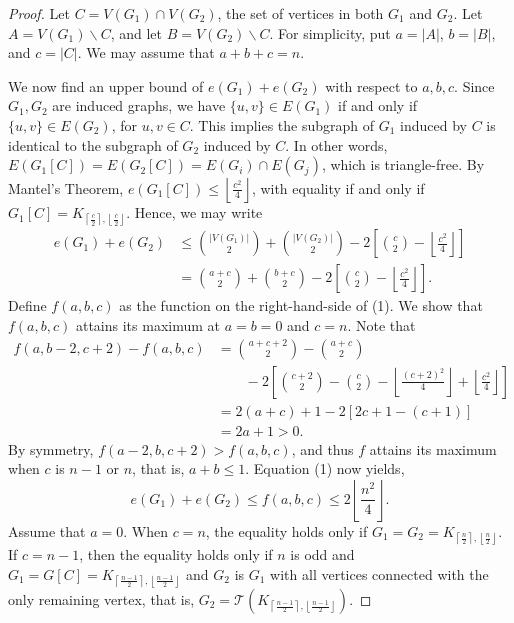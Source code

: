 \documentclass[a4paper]{article}
\begin{document}
\begin{proof}
  Let $C = V(G_1) \cap V(G_2)$, the set of vertices in both $G_1$ and $G_2$. Let $A = V(G_1)
  \backslash C$, and let $B = V(G_2) \backslash C$. For simplicity, put $a = |A|$, $b = |B|$, and $c
  = |C|$. We may assume that $a + b + c = n$.

  We now find an upper bound of $e(G_1) + e(G_2)$ with respect to $a, b, c$. Since $G_1, G_2$ are
  induced graphs, we have $\{u, v\} \in E(G_1)$ if and only if $\{u, v\} \in E(G_2)$, for $u, v \in
  C$. This implies the subgraph of $G_1$ induced by $C$ is identical to the subgraph of $G_2$
  induced by $C$. In other words, $E(G_1[C]) = E(G_2[C]) = E(G_i) \cap E(G_j)$, which is
  triangle-free. By Mantel's Theorem, $e(G_1[C]) \leq \left\lfloor\frac{c^2}{4}\right\rfloor$, with
  equality if and only if $G_1[C] = K_{\left\lceil\frac{c}{2}\right\rceil,
  \left\lfloor\frac{c}{2}\right\rfloor}$. Hence, we may write
  \begin{align}
    e(G_1) + e(G_2) 
    &\leq \binom{|V(G_1)|}{2} + \binom{|V(G_2)|}{2} - 2\left[\binom{c}{2} - \left\lfloor\frac{c^2}{4}\right\rfloor\right] \nonumber \\
    &= \binom{a + c}{2} + \binom{b + c}{2} - 2\left[\binom{c}{2} - \left\lfloor\frac{c^2}{4}\right\rfloor\right].
  \end{align}
  Define $f(a, b, c)$ as the function on the right-hand-side of (1). We show that $f(a, b, c)$
  attains its maximum at $a = b = 0$ and $c = n$. Note that
  \begin{align*}
    f(a, b - 2, c + 2) - f(a, b, c)
    &= \binom{a + c + 2}{2} - \binom{a + c}{2} \\
    &\qquad - 2\left[\binom{c + 2}{2} - \binom{c}{2} - \left\lfloor\frac{(c + 2)^2}{4}\right\rfloor + \left\lfloor\frac{c^2}{4}\right\rfloor\right] \\
    &= 2(a + c) + 1 - 2[2c + 1 - (c + 1)] \\
    &= 2a + 1 > 0.
  \end{align*}
  By symmetry, $f(a - 2, b, c + 2) > f(a, b, c)$, and thus $f$ attains its maximum when $c$ is $n -
  1$ or $n$, that is, $a + b \leq 1$. Equation (1) now yields, 
  \[
    e(G_1) + e(G_2) \leq f(a, b, c) \leq 2\left\lfloor\frac{n^2}{4}\right\rfloor.
  \]
  Assume that $a = 0$. When $c = n$, the equality holds only if $G_1 = G_2 =
  K_{\left\lceil\frac{n}{2}\right\rceil, \left\lfloor\frac{n}{2}\right\rfloor}$. If $c = n - 1$,
  then the equality holds only if $n$ is odd and $G_1 = G[C] = K_{\left\lceil\frac{n -
  1}{2}\right\rceil, \left\lfloor\frac{n - 1}{2}\right\rfloor}$ and $G_2$ is $G_1$ with all vertices
  connected with the only remaining vertex, that is, $G_2 = \mathcal{T}(K_{\left\lceil\frac{n -
  1}{2}\right\rceil, \left\lfloor\frac{n - 1}{2}\right\rfloor})$.
\end{proof}
\end{document}
